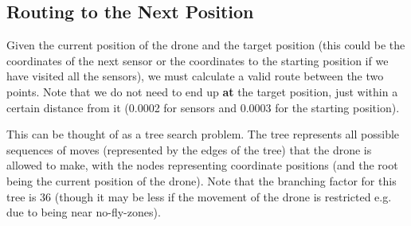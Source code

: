\documentclass[11pt]{article}
\begin{document}
\subsection{Routing to the Next Position}
Given the current position of the drone and the target position (this could be the coordinates of the next sensor or the coordinates to the starting position if we have visited all the sensors), we must calculate a valid route between the two points. Note that we do not need to end up \textbf{at} the target position, just within a certain distance from it (0.0002 for sensors and 0.0003 for the starting position).

This can be thought of as a tree search problem. The tree represents all possible sequences of moves (represented by the edges of the tree) that the drone is allowed to make, with the nodes representing coordinate positions (and the root being the current position of the drone). Note that the branching factor for this tree is 36 (though it may be less if the movement of the drone is restricted e.g. due to being near no-fly-zones).
\end{document}
